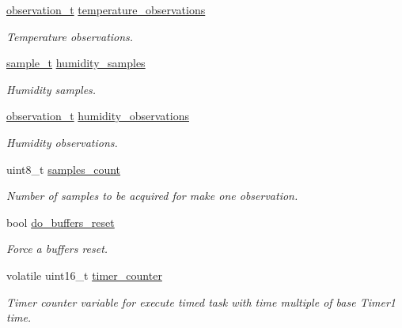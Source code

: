 \begin{DoxyCompactItemize}
\hyperlink{structobservation__t}{observation\+\_\+t} \hyperlink{i2c-th_8h_a3d73872b407d68a2858f5fd4104b8f46}{temperature\+\_\+observations}
\begin{DoxyCompactList}\small\item\em Temperature observations. \end{DoxyCompactList}\item 
\mbox{\label{i2c-th_8h_ac23e316e62b5e278d2122628612aeaff}} 
\hyperlink{structsample__t}{sample\+\_\+t} \hyperlink{i2c-th_8h_ac23e316e62b5e278d2122628612aeaff}{humidity\+\_\+samples}
\begin{DoxyCompactList}\small\item\em Humidity samples. \end{DoxyCompactList}\item 
\mbox{\label{i2c-th_8h_a6bac5b18b7caba6c00adfbf8c6cd909f}} 
\hyperlink{structobservation__t}{observation\+\_\+t} \hyperlink{i2c-th_8h_a6bac5b18b7caba6c00adfbf8c6cd909f}{humidity\+\_\+observations}
\begin{DoxyCompactList}\small\item\em Humidity observations. \end{DoxyCompactList}\item 
\mbox{\label{i2c-th_8h_a9a06fc202d1070e79bc838d46b69c7d1}} 
uint8\+\_\+t \hyperlink{i2c-th_8h_a9a06fc202d1070e79bc838d46b69c7d1}{samples\+\_\+count}
\begin{DoxyCompactList}\small\item\em Number of samples to be acquired for make one observation. \end{DoxyCompactList}\item 
\mbox{\label{i2c-th_8h_a52a9c0540faee23b8ff875f320290dea}} 
bool \hyperlink{i2c-th_8h_a52a9c0540faee23b8ff875f320290dea}{do\+\_\+buffers\+\_\+reset}
\begin{DoxyCompactList}\small\item\em Force a buffers reset. \end{DoxyCompactList}\item 
\mbox{\label{i2c-th_8h_afb83826ad15c7d630e9798a9b4055316}} 
volatile uint16\+\_\+t \hyperlink{i2c-th_8h_afb83826ad15c7d630e9798a9b4055316}{timer\+\_\+counter}
\begin{DoxyCompactList}\small\item\em Timer counter variable for execute timed task with time multiple of base Timer1 time. \end{DoxyCompactList}\item 

\end{DoxyCompactItemize}
